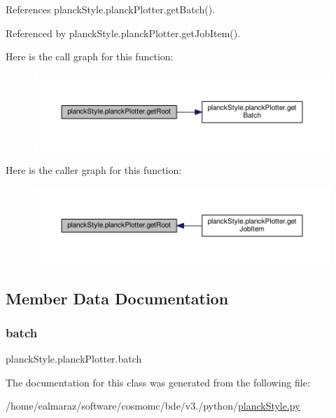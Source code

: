 References planck\+Style.\+planck\+Plotter.\+get\+Batch().



Referenced by planck\+Style.\+planck\+Plotter.\+get\+Job\+Item().

Here is the call graph for this function\+:
\nopagebreak
\begin{figure}[H]
\begin{center}
\leavevmode
\includegraphics[width=350pt]{classplanckStyle_1_1planckPlotter_a1f04dabee2f8f9fe8c4a8fcabdedb346_cgraph}
\end{center}
\end{figure}
Here is the caller graph for this function\+:
\nopagebreak
\begin{figure}[H]
\begin{center}
\leavevmode
\includegraphics[width=350pt]{classplanckStyle_1_1planckPlotter_a1f04dabee2f8f9fe8c4a8fcabdedb346_icgraph}
\end{center}
\end{figure}


\subsection{Member Data Documentation}
\mbox{\label{classplanckStyle_1_1planckPlotter_afdb5051848bcb1499284cfc17e3eb399}} 
\subsubsection{\texorpdfstring{batch}{batch}}
{\footnotesize\ttfamily planck\+Style.\+planck\+Plotter.\+batch}



The documentation for this class was generated from the following file\+:\begin{DoxyCompactItemize}
\item 
/home/ealmaraz/software/cosmomc/bde/v3./python/\mbox{\hyperlink{planckStyle_8py}{planck\+Style.\+py}}\end{DoxyCompactItemize}
